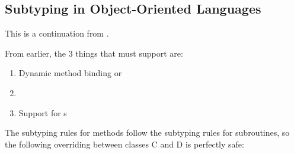 \subsection{Subtyping in Object-Oriented Languages}\label{subsec:Subtyping_Object_Oriented_Languages}
This is a continuation from .

From earlier, the 3 things that  must support are:
\begin{enumerate}[noitemsep]
\item Dynamic method binding or \emph{}
\item {}
\item Support for s
\end{enumerate}

The subtyping rules for methods follow the subtyping rules for subroutines, so the following overriding between classes C and D is perfectly safe:
\inputminted[frame=lines,linenos]{java}{./EDAP05-Concepts_Programming_Languages-Sections/Object_Oriented_Programming/Code/MethodSubtyping.java}

